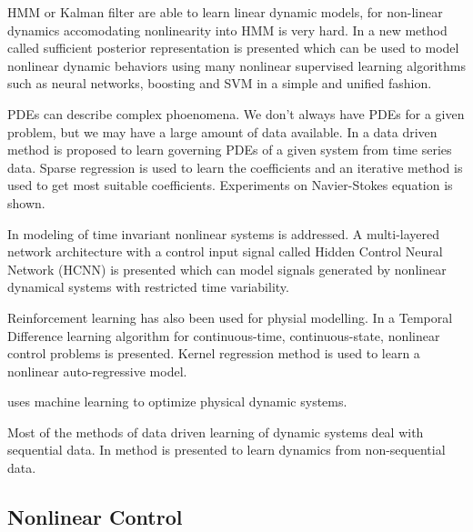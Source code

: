 \documentclass[conference]{IEEEtran}
\begin{document}
HMM or Kalman filter are able to learn linear dynamic models, for non-linear dynamics accomodating nonlinearity into HMM is very hard. In \cite{langford2009nonlinear} a new method called sufficient posterior representation is presented which can be used to model nonlinear dynamic behaviors using many nonlinear supervised learning algorithms such as neural networks, boosting and SVM in a simple and unified fashion.

PDEs can describe complex phoenomena. We don't always have PDEs for a given problem, but we may have a large amount of data available. In \cite{rudy2017datadriven} a data driven method is proposed to learn governing PDEs of a given system from time series data. Sparse regression is used to learn the coefficients and an iterative method is used to get most suitable coefficients. Experiments on Navier-Stokes equation is shown.

In \cite{levin1991nips} modeling of time invariant nonlinear systems is addressed. A multi-layered network architecture with a control input signal called Hidden Control Neural Network (HCNN) is presented which can model signals generated by nonlinear dynamical systems with restricted time variability.

Reinforcement learning has also been used for physial modelling. In \cite{doya1996nips} a Temporal Difference learning algorithm for continuous-time, continuous-state, nonlinear control problems is presented. Kernel regression method is used to learn a nonlinear auto-regressive model.

\cite{hermans2014automated} uses machine learning to optimize physical dynamic systems.

Most of the methods of data driven learning of dynamic systems deal with sequential data. In \cite{john2009nonlinear} method is presented to learn dynamics from non-sequential data.

\subsection{Nonlinear Control}

\cite{kim2005nips, aboueldahab2011identification, levin1991nips, milito1991nips, lippmann1991nips, scott1992nips, HBZnips96, takashi2005nonlinear, sabino1999chaos, sergey2011nips, schnider1997nips, doya1997nips, rawlik2010nips, emanuel2009nips, li2015dynamic, watter2015nips, jordan1990nips, rivals2000nn, brown1998ICDC, susemihl2014nips, Mozer1996TheNP, deng2008feedback, chen2002ICDC, timothy1994nips, yu1996nips}
\end{document}
